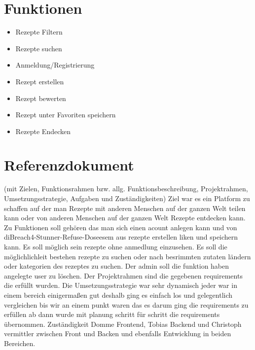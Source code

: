 \documentclass{article}
\begin{document}
\section{Funktionen}
\begin{multicols}{2}
    \begin{itemize}
        \item Rezepte Filtern
        \item Rezepte suchen
        \item Anmeldung/Registrierung
        \item Rezept erstellen
        \item Rezept bewerten
        \item Rezept unter Favoriten speichern
        \item Rezepte Endecken
    \end{itemize}
\end{multicols}

\section{Referenzdokument}
(mit Zielen, Funktionsrahmen bzw. allg. Funktionsbeschreibung, Projektrahmen, Umsetzungsstrategie, Aufgaben und Zuständigkeiten)
\newline\newline
Ziel war es ein Platform zu schaffen auf der man Rezepte mit anderen Menschen auf der ganzen Welt teilen kann oder von anderen Menschen auf der ganzen Welt Rezepte entdecken kann. 
\newline
Zu Funktionen soll gehören das man sich einen acount anlegen kann und von diBreach4-Stunner-Refuse-Doseesem aus rezepte erstellen liken und speichern kann. Es soll möglich sein rezepte ohne anmedlung einzusehen. Es soll die möglichlichleit bestehen rezepte zu suchen oder nach besrimmten zutaten ländern oder kategorien des rezeptes zu suchen. Der admin soll die funktion haben angelegte user zu löschen. 
\newline
Der Projektrahmen sind die gegebenen requirements die erfüllt wurden.
\newline
Die Umsetzungsstrategie war sehr dynamisch jeder war in einem bereich einigermaßen gut deshalb ging es einfach los und gelegentlich vergleichen bis wir an einem punkt waren das es darum ging die requirements zu erfüllen ab dann wurde mit planung schritt für schritt die requirements übernommen. 
\newline
Zuständigkeit Domme Frontend, Tobias Backend und Christoph vermittler zwischen Front und Backen und ebenfalls Entwicklung in beiden Bereichen.
\end{document}
